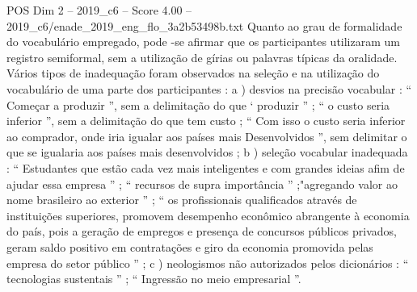 \begin{textsample}{POS Dim 2 – 2019\_c6 – Score 4.00 – 2019\_c6/enade\_2019\_eng\_flo\_3a2b53498b.txt}
Quanto ao grau de formalidade do vocabulário empregado, pode -se afirmar que os participantes utilizaram um registro semiformal, sem a utilização de gírias ou palavras típicas da oralidade.
Vários tipos de inadequação foram observados na seleção e na utilização do vocabulário de uma parte dos participantes : a ) desvios na precisão vocabular : “ Começar a produzir ”, sem a delimitação do que ‘ produzir ” ; “ o custo seria inferior ”, sem a delimitação do que tem custo ; “ Com isso o custo seria inferior ao comprador, onde iria igualar aos países mais Desenvolvidos ”, sem delimitar o que se igualaria aos países mais desenvolvidos ; b ) seleção vocabular inadequada : “ Estudantes que estão cada vez mais inteligentes e com grandes ideias afim de ajudar essa empresa ” ; “ recursos de supra importância ” ;"agregando valor ao nome brasileiro ao exterior ” ; “ os profissionais qualificados através de instituições superiores, promovem desempenho econômico abrangente à economia do país, pois a geração de empregos e presença de concursos públicos privados, geram saldo positivo em contratações e giro da economia promovida pelas empresa do setor público ” ; c ) neologismos não autorizados pelos dicionários : “ tecnologias sustentais ” ; “ Ingressão no meio empresarial ”.

\end{textsample}
